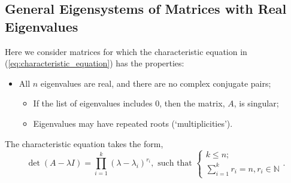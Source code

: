 \documentclass[12pt, twoside, draft]{article}
\begin{document}
\subsection{General Eigensystems of Matrices with Real Eigenvalues}\label{sec:eigensystems-real-eigenvalues}
Here we consider matrices for which the characteristic equation in (\ref{eq:characteristic_equation}) has the properties:
\begin{itemize}[noitemsep]
\item All $n$ eigenvalues are real, and there are no complex conjugate pairs;
\begin{itemize}[noitemsep]
 \item If the list of eigenvalues includes 0, then the matrix, $A$, is singular;
 \item Eigenvalues may have repeated roots (`multiplicities').
\end{itemize}
\end{itemize}
  The characteristic equation takes the form,
 \begin{equation}\label{eq:characteristic_equation_full_real}
\det(A - \lambda I) = \prod_{i=1}^k (\lambda - \lambda_i)^{r_i}, \text{ such that }  \begin{cases} k \leq n; \\ \sum_{i=1}^k r_i = n, r_i \in \mathbb{N} \end{cases} . 
\end{equation}
\end{document}
